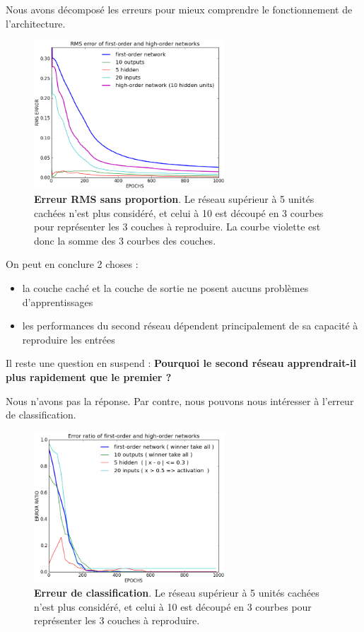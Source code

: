 \documentclass[a4paper,12pt, twoside]{article}
\begin{document}
Nous avons décomposé les erreurs pour mieux comprendre le fonctionnement de l'architecture.

\begin{figure}[H]
\begin{center}
 \includegraphics[width=270px]{../cleeremans_2007/digit_reco/rms_ffa.png}
\end{center}
\caption{ \textbf{Erreur RMS sans proportion}. Le réseau supérieur à 5 unités cachées n'est plus considéré, et celui à 
10 est découpé en 3 courbes pour représenter les 3 couches à reproduire. La courbe violette est donc la somme des 3 courbes des 
couches.}
\end{figure}

On peut en conclure 2 choses :
\begin{itemize}
 \item la couche caché et la couche de sortie ne posent aucuns problèmes d'apprentissages
 \item les performances du second réseau dépendent principalement de sa capacité à reproduire les entrées
\end{itemize}

Il reste une question en suspend :
\newline
\textbf{Pourquoi le second réseau apprendrait-il plus rapidement que le premier ?}

Nous n'avons pas la réponse. Par contre, nous pouvons nous intéresser à l'erreur de classification.

\begin{figure}[H]
\begin{center}
 \includegraphics[width=270px]{../cleeremans_2007/digit_reco/err_ffa.png}
\end{center}
\caption{ \textbf{Erreur de classification}. Le réseau supérieur à 5 unités cachées n'est plus considéré, et celui à
10 est découpé en 3 courbes pour représenter les 3 couches à reproduire.}
\end{figure}
\end{document}
